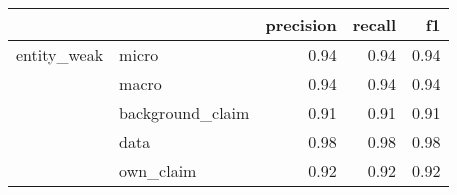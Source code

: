 \begin{tabular}{llrrr}
\toprule
            &           &  precision &  recall &   f1 \\
\midrule
entity\_weak & micro &       0.94 &    0.94 & 0.94 \\
            & macro &       0.94 &    0.94 & 0.94 \\
            & background\_claim &       0.91 &    0.91 & 0.91 \\
            & data &       0.98 &    0.98 & 0.98 \\
            & own\_claim &       0.92 &    0.92 & 0.92 \\
\bottomrule
\end{tabular}
